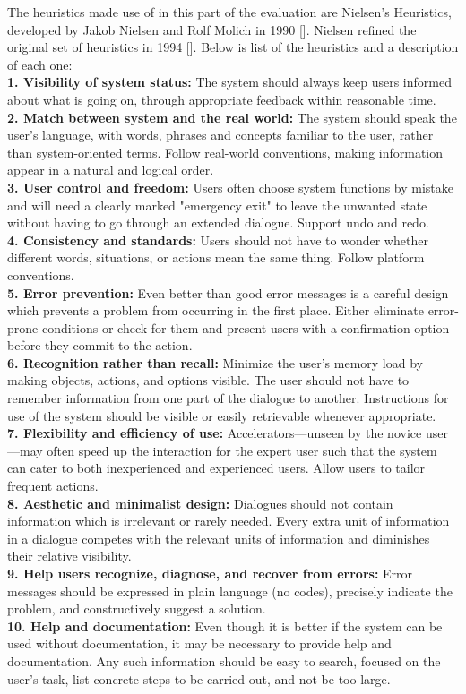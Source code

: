 \documentclass{article}
\begin{document}
The heuristics made use of in this part of the evaluation are Nielsen's Heuristics, developed by Jakob Nielsen and Rolf Molich in 1990 []. Nielsen refined the original set of heuristics in 1994 []. Below is list of the heuristics and a description of each one:
\\
\textbf{1. Visibility of system status:}
The system should always keep users informed about what is going on, through appropriate feedback within reasonable time.
\\
\textbf{2. Match between system and the real world:}
The system should speak the user's language, with words, phrases and concepts familiar to the user, rather than system-oriented terms. Follow real-world conventions, making information appear in a natural and logical order.
\\
\textbf{3. User control and freedom:}
Users often choose system functions by mistake and will need a clearly marked "emergency exit" to leave the unwanted state without having to go through an extended dialogue. Support undo and redo.
\\
\textbf{4. Consistency and standards:}
Users should not have to wonder whether different words, situations, or actions mean the same thing. Follow platform conventions.
\\
\textbf{5. Error prevention:}
Even better than good error messages is a careful design which prevents a problem from occurring in the first place. Either eliminate error-prone conditions or check for them and present users with a confirmation option before they commit to the action.
\\
\textbf{6. Recognition rather than recall:}
Minimize the user's memory load by making objects, actions, and options visible. The user should not have to remember information from one part of the dialogue to another. Instructions for use of the system should be visible or easily retrievable whenever appropriate.
\\
\textbf{7. Flexibility and efficiency of use:}
Accelerators—unseen by the novice user—may often speed up the interaction for the expert user such that the system can cater to both inexperienced and experienced users. Allow users to tailor frequent actions.
\\
\textbf{8. Aesthetic and minimalist design:}
Dialogues should not contain information which is irrelevant or rarely needed. Every extra unit of information in a dialogue competes with the relevant units of information and diminishes their relative visibility.
\\
\textbf{9. Help users recognize, diagnose, and recover from errors:}
Error messages should be expressed in plain language (no codes), precisely indicate the problem, and constructively suggest a solution.
\\
\textbf{10. Help and documentation:}
Even though it is better if the system can be used without documentation, it may be necessary to provide help and documentation. Any such information should be easy to search, focused on the user's task, list concrete steps to be carried out, and not be too large.\\
\end{document}

